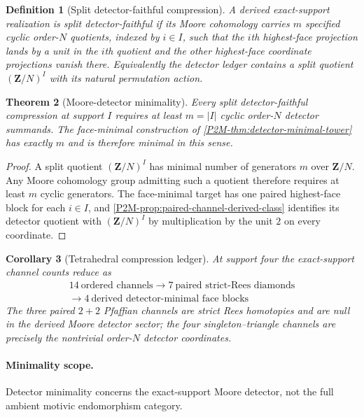 \documentclass[11pt]{article}
\newtheorem{theorem}{Theorem}[section]
\newtheorem{corollary}[theorem]{Corollary}
\newtheorem{definition}[theorem]{Definition}
\theoremstyle{remark}
\newcommand{\Z}{\mathbf Z}
\begin{document}
\begin{definition}[Split detector-faithful compression]
\label{P2M-def:split-detector-faithful}
A derived exact-support realization is \emph{split detector-faithful} if its
Moore cohomology carries $m$ specified cyclic order-$N$ quotients, indexed by
$i\in I$, such that the $i$th highest-face projection lands by a unit in the
$i$th quotient and the other highest-face coordinate projections vanish
there.  Equivalently the detector ledger contains a split quotient
$(\Z/N)^I$ with its natural permutation action.
\end{definition}

\begin{theorem}[Moore-detector minimality]
\label{P2M-thm:moore-detector-minimality}
Every split detector-faithful compression at support $I$ requires at least
$m=|I|$ cyclic order-$N$ detector summands.  The face-minimal construction of
\cref{P2M-thm:detector-minimal-tower} has exactly $m$ and is therefore minimal in
this sense.
\end{theorem}

\begin{proof}
A split quotient $(\Z/N)^I$ has minimal number of generators $m$ over
$\Z/N$.  Any Moore cohomology group admitting such a quotient therefore
requires at least $m$ cyclic generators.  The face-minimal target has one
paired highest-face block for each $i\in I$, and
\cref{P2M-prop:paired-channel-derived-class} identifies its detector quotient
with $(\Z/N)^I$ by multiplication by the unit $2$ on every coordinate.
\end{proof}

\begin{corollary}[Tetrahedral compression ledger]
\label{P2M-cor:tetrahedral-compression-ledger}
At support four the exact-support channel counts reduce as
\[
 \boxed{
 \begin{gathered}
 14\ \text{ordered channels}
 \longrightarrow
 7\ \text{paired strict-Rees diamonds}\\
 {}\longrightarrow
 4\ \text{derived detector-minimal face blocks}
 \end{gathered}}
\]
The three paired $2+2$ Pfaffian channels are strict Rees homotopies and are
null in the derived Moore detector sector; the four singleton--triangle
channels are precisely the nontrivial order-$N$ detector coordinates.
\end{corollary}

\paragraph{Minimality scope.}
Detector minimality concerns the exact-support Moore detector, not the full
ambient motivic endomorphism category.
\end{document}
